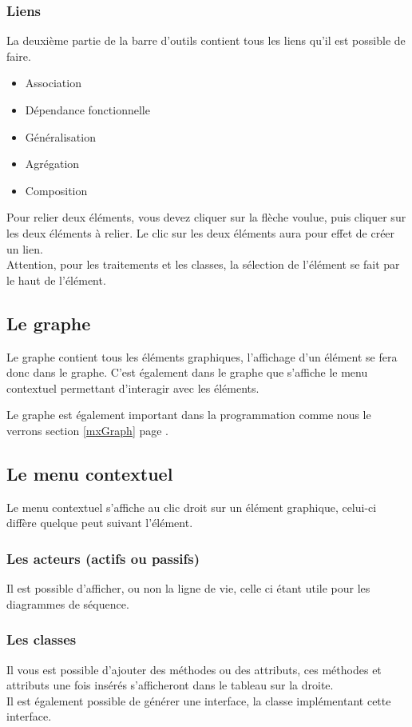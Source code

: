 \documentclass[12pt,a4paper,oneside]{book}
\begin{document}
	\subsubsection{Liens}
	La deuxième partie de la barre d'outils contient tous les liens qu'il est possible de faire.
	\begin{itemize}
		\item Association
		\item Dépendance fonctionnelle
		\item Généralisation
		\item Agrégation
		\item Composition
	\end{itemize}
		Pour relier deux éléments, vous devez cliquer sur la flèche voulue, puis cliquer sur les deux éléments à relier. 
	Le clic sur les deux éléments aura pour effet de créer un lien.\\
	Attention, pour les traitements et les classes, la sélection de l'élément se fait par le haut de l'élément.
	\subsection{Le graphe}
	Le graphe contient tous les éléments graphiques, l'affichage d'un élément se fera donc dans le graphe. 
	C'est également dans le graphe que s'affiche le menu contextuel permettant d'interagir avec les éléments.

	Le graphe est également important dans la programmation comme nous le verrons section \ref{mxGraph} page \pageref{mxGraph}.

	\subsection{Le menu contextuel}
	Le menu contextuel s'affiche au clic droit sur un élément graphique, celui-ci diffère quelque peut suivant l'élément. 
		\subsubsection{Les acteurs (actifs ou passifs)}
		Il est possible d'afficher, ou non la ligne de vie, celle ci étant utile pour les diagrammes de séquence.
		\subsubsection{Les classes}
		Il vous est possible d'ajouter des méthodes ou des attributs, ces méthodes et attributs une fois insérés s'afficheront dans le tableau sur la droite.\\
		Il est également possible de générer une interface, la classe implémentant cette interface.
\end{document}
